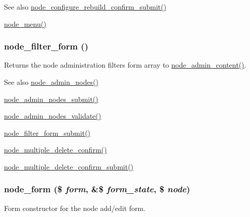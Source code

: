 \begin{DoxySeeAlso}{See also}
\hyperlink{node_8admin_8inc_a81b709fbced4062b5c58137a9255fab4}{node\_\-configure\_\-rebuild\_\-confirm\_\-submit()} 

\hyperlink{node_8module_a15e8d85a7559f22b8f2c77c1d5dfac63}{node\_\-menu()} 
\end{DoxySeeAlso}
\hypertarget{group__forms_ga2b7edb82b488db11ffde4fa60958004d}{
\subsubsection[{node\_\-filter\_\-form}]{\setlength{\rightskip}{0pt plus 5cm}node\_\-filter\_\-form ()}}
\label{group__forms_ga2b7edb82b488db11ffde4fa60958004d}
Returns the node administration filters form array to \hyperlink{group__forms_ga9e864b6f961a37906f23989987913091}{node\_\-admin\_\-content()}.

\begin{DoxySeeAlso}{See also}
\hyperlink{group__forms_ga3fb56c702a3c16eddd2fcd8ccd3e4adb}{node\_\-admin\_\-nodes()} 

\hyperlink{node_8admin_8inc_a5f159cfed0d6cce65d5d70747efec391}{node\_\-admin\_\-nodes\_\-submit()} 

\hyperlink{node_8admin_8inc_a32a9ea91250aaf84de44f784a3569944}{node\_\-admin\_\-nodes\_\-validate()} 

\hyperlink{node_8admin_8inc_a346f00ebb9b4aae36025623d893c5061}{node\_\-filter\_\-form\_\-submit()} 

\hyperlink{group__forms_ga25cc06a5aa3aa17eadc5a8a97e7c5e9e}{node\_\-multiple\_\-delete\_\-confirm()} 

\hyperlink{node_8admin_8inc_ab8a2e11edeef2797ca739f94d1eb1af9}{node\_\-multiple\_\-delete\_\-confirm\_\-submit()} 
\end{DoxySeeAlso}
\hypertarget{group__forms_ga267299500e205db099ee4e8396769d3f}{
\subsubsection[{node\_\-form}]{\setlength{\rightskip}{0pt plus 5cm}node\_\-form (\$ {\em form}, \/  \&\$ {\em form\_\-state}, \/  \$ {\em node})}}
\label{group__forms_ga267299500e205db099ee4e8396769d3f}
Form constructor for the node add/edit form.

